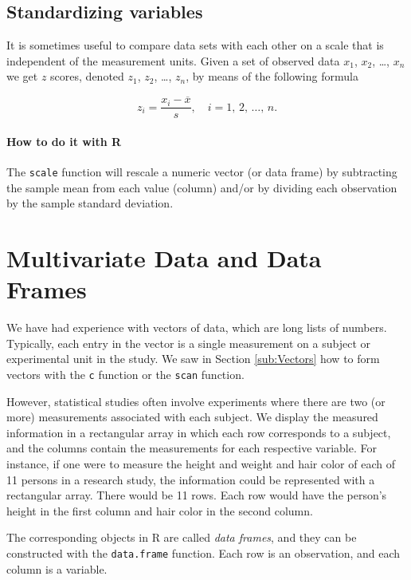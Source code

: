 \documentclass[captions=tableheading]{scrbook}
\begin{document}
\subsection{Standardizing variables}
\label{sec-3-4-5}


It is sometimes useful to compare data sets with each other on a scale that is independent of the measurement units. Given a set of observed data \(x_{1}\), \(x_{2}\), \ldots{}, \(x_{n}\) we get \(z\) scores, denoted \(z_{1}\), \(z_{2}\), \ldots{}, \(z_{n}\), by means of the following formula

\[
z_{i}=\frac{x_{i}-\overline{x}}{s},\quad i=1,\,2,\,\ldots,\, n.
\]


\paragraph*{How to do it with \textsf{R}}

The \texttt{scale} function will rescale a numeric vector (or data frame) by subtracting the sample mean from each value (column) and/or by dividing each observation by the sample standard deviation.
\section{Multivariate Data and Data Frames}
\label{sec-3-5}

\label{sec:multivariate-data}

We have had experience with vectors of data, which are long lists of numbers. Typically, each entry in the vector is a single measurement on a subject or experimental unit in the study. We saw in Section \ref{sub:Vectors} how to form vectors with the \texttt{c} function or the \texttt{scan} function. 

However, statistical studies often involve experiments where there are two (or more) measurements associated with each subject. We display the measured information in a rectangular array in which each row corresponds to a subject, and the columns contain the measurements for each respective variable. For instance, if one were to measure the height and weight and hair color of each of 11 persons in a research study, the information could be represented with a rectangular array. There would be 11 rows. Each row would have the person's height in the first column and hair color in the second column.

The corresponding objects in \textsf{R} are called \emph{data frames}, and they can be constructed with the \texttt{data.frame} function. Each row is an observation, and each column is a variable.
\end{document}
